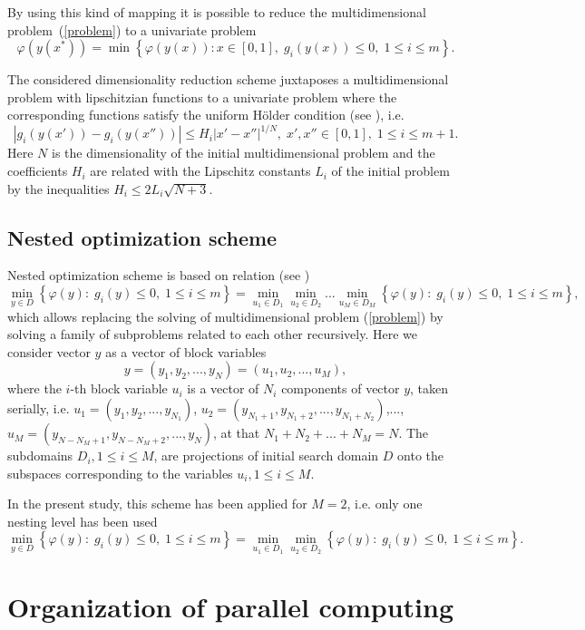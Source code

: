 \documentclass[a4paper]{jpconf}
\begin{document}
By using this kind of mapping it is possible to reduce the multidimensional 
problem~(\ref{problem}) to a univariate problem
\[
\varphi(y(x^\ast))=\min \left\{\varphi(y(x)): x \in [0,1], \; g_i(y(x))\leq 
0, \; 1 \leq i \leq m\right\}.
\]

The considered dimensionality reduction scheme juxtaposes a
multidimensional problem with lipschitzian functions to a univariate
problem where the corresponding functions satisfy the uniform H{\"o}lder
condition (see \cite{Strongin2000}), i.e.
\[
\left|g_i(y(x'))-g_i (y(x''))\right| \leq H_i \left|x'-x'' \right|^{1/N}, \; 
x',x''\in [0,1], \; 1\leq i \leq m+1.
\]
Here $N$ is the dimensionality of the initial multidimensional problem and
the coefficients $H_i$ are related with the Lipschitz constants $L_i$ of
the initial problem by the inequalities $H_i \leq 2L_i \sqrt{N+3}$.

\subsection{Nested optimization scheme}

Nested optimization scheme is based on relation (see \cite{Strongin2013})
\[
\min_{y \in D}{\left\{\varphi(y): \; g_i(y)\leq 0, \; 1 \leq i \leq 
m\right\}}= \min_{u_1\in D_1}\min_{u_2\in D_2}...\min_{u_M\in D_M 
}{\left\{\varphi(y): \; g_i(y)\leq 0, \; 1 \leq i \leq m\right\}},
\]
which allows replacing the solving of multidimensional problem 
(\ref{problem}) by solving a family of subproblems related to each other 
recursively.
Here we consider vector $y$ as a vector of block variables
\[
y=(y_1,y_2,...,y_N)=(u_1,u_2,...,u_M),
\]
where the $i$-th block variable $u_i$ is a vector of $N_i$ components of 
vector $y$, taken serially, i.e. $u_1=(y_1,y_2,...,y_{N_1})$, 
$u_2=(y_{N_1+1},y_{N_1+2},...,y_{N_1+N_2})$,..., $u_M=(y_{N-N_M+1},y_{N-
N_M+2},...,y_{N})$, at that $N_1+N_2+...+N_M=N$. 
The subdomains $D_i, 1 \leq i \leq M$, are projections of initial search 
domain $D$ onto the subspaces corresponding to the variables $u_i, 1 \leq i 
\leq M$. 

In the present study, this scheme has been applied for $M=2$, i.e. only one 
nesting level has been used
\[
\min_{y \in D}{\left\{\varphi(y): \; g_i(y)\leq 0, \; 1 \leq i \leq 
m\right\}}= \min_{u_1\in D_1}\min_{u_2\in D_2}{\left\{\varphi(y): \; 
g_i(y)\leq 0, \; 1 \leq i \leq m\right\}}.
\]

\section{Organization of parallel computing}\label{sec:4}
\end{document}

